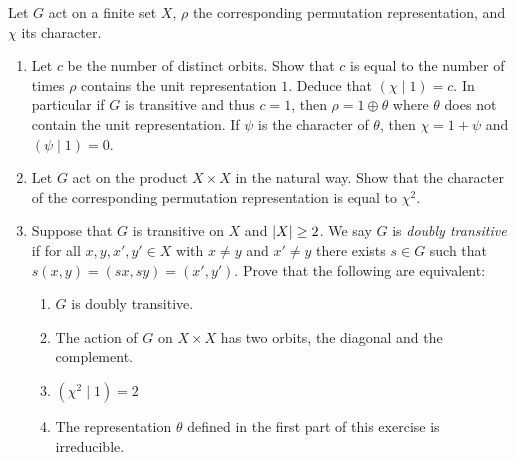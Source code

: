 \documentclass[letterpaper, 11pt, oneside]{book}
\begin{document}
\begin{exercise}
  Let $G$ act on a finite set $X$, $\rho$ the corresponding permutation representation, and $\chi$ its character.
  \begin{enumerate}
  \item Let $c$ be the number of distinct orbits.
        Show that $c$ is equal to the number of times $\rho$ contains the unit representation $1$.
        Deduce that $(\chi \mid 1) = c$.
        In particular if $G$ is transitive and thus $c = 1$, then $\rho = 1 \oplus \theta$ where $\theta$ does not contain the unit representation.
        If $\psi$ is the character of $\theta$, then $\chi = 1 + \psi$ and $(\psi \mid 1) = 0$.
  \item Let $G$ act on the product $X \times X$ in the natural way.
        Show that the character of the corresponding permutation representation is equal to $\chi^{2}$.
  \item Suppose that $G$ is transitive on $X$ and $\abs{X} \geq 2$.
        We say $G$ is \emph{doubly transitive} if for all $x, y, x', y' \in X$ with $x \neq y$ and $x' \neq y$ there exists $s \in G$ such that $s(x, y) = (sx, sy) = (x', y')$.
        Prove that the following are equivalent:
        \begin{enumerate}
        \item $G$ is doubly transitive.
        \item The action of $G$ on $X \times X$ has two orbits, the diagonal and the complement.
        \item $(\chi^{2} \mid 1) = 2$
        \item The representation $\theta$ defined in the first part of this exercise is irreducible.
        \end{enumerate}
  \end{enumerate}
\end{exercise}

\clearpage
\end{document}
